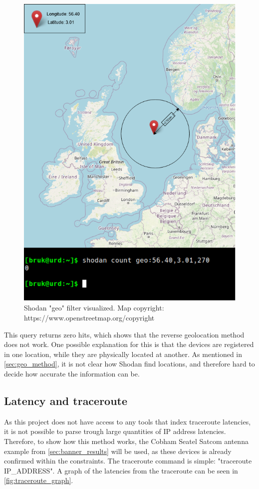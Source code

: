 \begin{figure} [H]
    \centering
    \includegraphics[scale=0.5]{Figurer/geolocation.png}
    \caption{Shodan "geo" filter visualized. Map copyright: https://www.openstreetmap.org/copyright}
    \label{fig:geolocation}
\end{figure}

This query returns zero hits, which shows that the reverse geolocation method does not work. One possible explanation for this is that the devices are registered in one location, while they are physically located at another. As mentioned in \cref{sec:geo_method}, it is not clear how Shodan find locations, and therefore hard to decide how accurate the information can be.

\subsection{Latency and traceroute} \label{sec:latency_results}
As this project does not have access to any tools that index traceroute latencies, it is not possible to parse trough large quantities of IP address latencies. Therefore, to show how this method works, the Cobham Seatel Satcom antenna example from \cref{sec:banner_results} will be used, as these devices is already confirmed within the constraints. The traceroute command is simple: "traceroute IP\_ADDRESS". A graph of the latencies from the traceroute can be seen in \cref{fig:traceroute_graph}.

